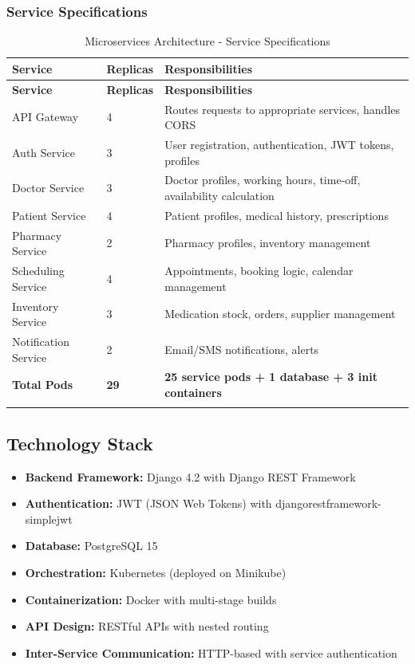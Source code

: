 \documentclass[12pt,a4paper]{article}
\begin{document}
\subsubsection{Service Specifications}
\begin{longtable}{@{}p{3cm}p{1.5cm}p{8cm}@{}}
\toprule
\textbf{Service} & \textbf{Replicas} & \textbf{Responsibilities} \\
\midrule
\endfirsthead
\toprule
\textbf{Service} & \textbf{Replicas} & \textbf{Responsibilities} \\
\midrule
\endhead
API Gateway & 4 & Routes requests to appropriate services, handles CORS \\
Auth Service & 3 & User registration, authentication, JWT tokens, profiles \\
Doctor Service & 3 & Doctor profiles, working hours, time-off, availability calculation \\
Patient Service & 4 & Patient profiles, medical history, prescriptions \\
Pharmacy Service & 2 & Pharmacy profiles, inventory management \\
Scheduling Service & 4 & Appointments, booking logic, calendar management \\
Inventory Service & 3 & Medication stock, orders, supplier management \\
Notification Service & 2 & Email/SMS notifications, alerts \\
\midrule
\textbf{Total Pods} & \textbf{29} & \textbf{25 service pods + 1 database + 3 init containers} \\
\bottomrule
\caption{Microservices Architecture - Service Specifications}
\end{longtable}

\subsection{Technology Stack}
\begin{itemize}
    \item \textbf{Backend Framework:} Django 4.2 with Django REST Framework
    \item \textbf{Authentication:} JWT (JSON Web Tokens) with djangorestframework-simplejwt
    \item \textbf{Database:} PostgreSQL 15
    \item \textbf{Orchestration:} Kubernetes (deployed on Minikube)
    \item \textbf{Containerization:} Docker with multi-stage builds
    \item \textbf{API Design:} RESTful APIs with nested routing
    \item \textbf{Inter-Service Communication:} HTTP-based with service authentication
\end{itemize}
\end{document}
